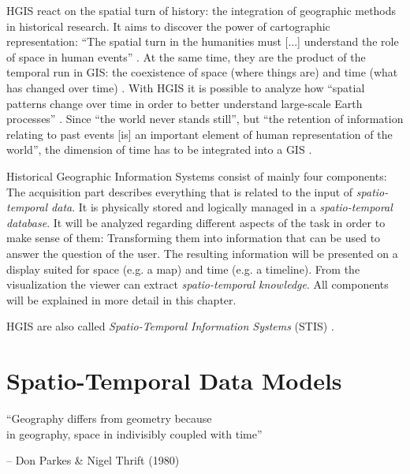 HGIS react on the spatial turn of history: the integration of geographic methods in historical research. It aims to discover the power of cartographic representation: ``The spatial turn in the humanities must [...] understand the role of space in human events''
\cite{bodenhamer2010spatial}.
At the same time, they are the product of the temporal run in GIS: the coexistence of space (where things are) and time (what has changed over time)
\cite[p. 45]{solana2014spatio}.
With HGIS it is possible to analyze how ``spatial patterns change over time in order to better understand large-scale Earth processes''
\cite{peuquet99}.
Since ``the world never stands still'', but ``the retention of information relating to past events [is] an important element of human representation of the world'', the dimension of time has to be integrated into a GIS
\cite{peuquet99}.

Historical Geographic Information Systems consist of mainly four components: The acquisition part describes everything that is related to the input of \emph{spatio-temporal data}. It is physically stored and logically managed in a \emph{spatio-temporal database}. It will be analyzed regarding different aspects of the task in order to make sense of them: Transforming them into information that can be used to answer the question of the user. The resulting information will be presented on a display suited for space (e.g. a map) and time (e.g. a timeline). From the visualization the viewer can extract \emph{spatio-temporal knowledge}. All components will be explained in more detail in this chapter.

HGIS are also called \emph{Spatio-Temporal Information Systems} (STIS)
\cite{pelekis04stdms}.




\section{Spatio-Temporal Data Models} %
\label{sec:spatio_temporal_data_models}
\begin{quoteit}
  ``Geography differs from geometry because \\
  in geography, space in indivisibly coupled with time''
\end{quoteit}
\hfill -- Don Parkes \& Nigel Thrift (1980)


